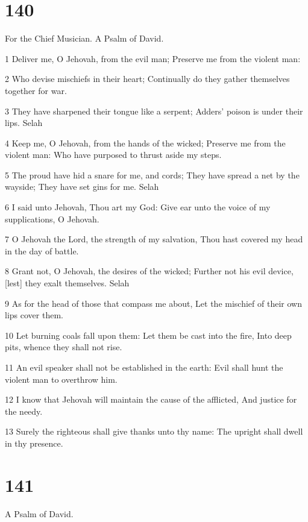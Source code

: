 \chapter{140}

\par For the Chief Musician. A Psalm of David.

\par 1 Deliver me, O Jehovah, from the evil man; Preserve me from the violent man:
\par 2 Who devise mischiefs in their heart; Continually do they gather themselves together for war.
\par 3 They have sharpened their tongue like a serpent; Adders' poison is under their lips. Selah
\par 4 Keep me, O Jehovah, from the hands of the wicked; Preserve me from the violent man: Who have purposed to thrust aside my steps.
\par 5 The proud have hid a snare for me, and cords; They have spread a net by the wayside; They have set gins for me. Selah
\par 6 I said unto Jehovah, Thou art my God: Give ear unto the voice of my supplications, O Jehovah.
\par 7 O Jehovah the Lord, the strength of my salvation, Thou hast covered my head in the day of battle.
\par 8 Grant not, O Jehovah, the desires of the wicked; Further not his evil device, [lest] they exalt themselves. Selah
\par 9 As for the head of those that compass me about, Let the mischief of their own lips cover them.
\par 10 Let burning coals fall upon them: Let them be cast into the fire, Into deep pits, whence they shall not rise.
\par 11 An evil speaker shall not be established in the earth: Evil shall hunt the violent man to overthrow him.
\par 12 I know that Jehovah will maintain the cause of the afflicted, And justice for the needy.
\par 13 Surely the righteous shall give thanks unto thy name: The upright shall dwell in thy presence.

\chapter{141}

\par A Psalm of David.

